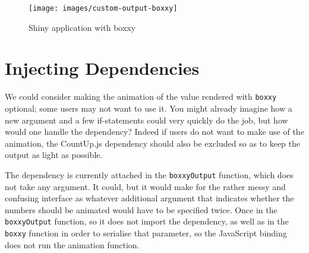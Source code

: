 \documentclass[10pt,]{krantz}
\makeatletter
\newenvironment{Shaded}{\begin{snugshade}}{\end{snugshade}}
\newcommand{\CommentTok}[1]{\textcolor[rgb]{0.37,0.37,0.37}{\textit{#1}}}
\newcommand{\ControlFlowTok}[1]{\textcolor[rgb]{0.27,0.27,0.27}{\textbf{#1}}}
\newcommand{\DataTypeTok}[1]{\textcolor[rgb]{0.27,0.27,0.27}{#1}}
\newcommand{\DecValTok}[1]{\textcolor[rgb]{0.06,0.06,0.06}{#1}}
\newcommand{\KeywordTok}[1]{\textcolor[rgb]{0.27,0.27,0.27}{\textbf{#1}}}
\newcommand{\NormalTok}[1]{#1}
\newcommand{\OperatorTok}[1]{\textcolor[rgb]{0.43,0.43,0.43}{\textbf{#1}}}
\newcommand{\OtherTok}[1]{\textcolor[rgb]{0.37,0.37,0.37}{#1}}
\newcommand{\StringTok}[1]{\textcolor[rgb]{0.5,0.5,0.5}{#1}}
\newenvironment{kframe}{%
\medskip{}
\setlength{\fboxsep}{.8em}
 \def\at@end@of@kframe{}%
 \ifinner\ifhmode%
  \def\at@end@of@kframe{\end{minipage}}%
  \begin{minipage}{\columnwidth}%
 \fi\fi%
 \def\FrameCommand##1{\hskip\@totalleftmargin \hskip-\fboxsep
 \colorbox{shadecolor}{##1}\hskip-\fboxsep
     \hskip-\linewidth \hskip-\@totalleftmargin \hskip\columnwidth}%
 \MakeFramed {\advance\hsize-\width
   \@totalleftmargin\z@ \linewidth\hsize
   \@setminipage}}%
 {\par\unskip\endMakeFramed%
 \at@end@of@kframe}
\renewenvironment{Shaded}{\begin{kframe}}{\end{kframe}}
\makeatother
\begin{document}
\begin{figure}[H]

{\centering \texttt{[image: images/custom-output-boxxy]} 

}

\caption{Shiny application with boxxy}\label{fig:boxxy-custom}
\end{figure}

\hypertarget{shiny-output-inject}{%
\section{Injecting Dependencies}\label{shiny-output-inject}}

We could consider making the animation of the value rendered with \texttt{boxxy} optional; some users may not want to use it. You might already imagine how a new argument and a few if-statements could very quickly do the job, but how would one handle the dependency? Indeed if users do not want to make use of the animation, the CountUp.js dependency should also be excluded so as to keep the output as light as possible.

The dependency is currently attached in the \texttt{boxxyOutput} function, which does not take any argument. It could, but it would make for the rather messy and confusing interface as whatever additional argument that indicates whether the numbers should be animated would have to be specified twice. Once in the \texttt{boxxyOutput} function, so it does not import the dependency, as well as in the \texttt{boxxy} function in order to serialise that parameter, so the JavaScript binding does not run the animation function.

\begin{Shaded}
\end{Shaded}
\end{document}
